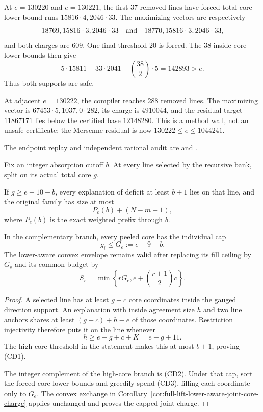 \documentclass[11pt,a4paper]{amsart}
\numberwithin{equation}{section}
\theoremstyle{remark}
\begin{document}
\begin{remark}
At \(e=130220\) and \(e=130221\), the first 37 removed lines have forced
total-core lower-bound runs \(15816\cdot4,2046\cdot33\).  The maximizing
vectors are respectively
\[
 18769,15816\cdot3,2046\cdot33
 \quad\hbox{and}\quad
 18770,15816\cdot3,2046\cdot33,
\]
and both charges are \(609\).  One final threshold \(20\) is forced.  The
38 inside-core lower bounds then give
\[
 5\cdot15811+33\cdot2041-\binom{38}{2}\cdot5
 =142893>e.
\]
Thus both supports are safe.

At adjacent \(e=130222\), the compiler reaches 288 removed lines.  The
maximizing vector is \(67453\cdot5,1037,0\cdot282\), its charge is
\(4910044\), and the residual target \(11867171\) lies below the certified
base \(12148280\).  This is a method wall, not an unsafe certificate; the
Mersenne residual is now \(130222\le e\le1044241\).

The endpoint replay and independent rational audit are
and
.
\end{remark}

\begin{corollary}
\label{cor:full-lift-core-dichotomy-capped-charge}
Fix an integer absorption cutoff $b$.  At every line selected by the
recursive bank, split on its actual total core $g$.

If $g\ge e+10-b$, every explanation of deficit at least $b+1$ lies on
that line, and the original family has size at most
\[
 P_e(b)+(N-m+1),                                  \tag{CD1}
\]
where $P_e(b)$ is the exact weighted prefix through $b$.

In the complementary branch, every peeled core has the individual cap
\[
 g_i\le G_e:=e+9-b.                               \tag{CD2}
\]
The lower-aware convex envelope remains valid after replacing its fill
ceiling by $G_e$ and its common budget by
\[
 S_r=\min\left\{rG_e,e+\binom{r+1}{2}c\right\}.   \tag{CD3}
\]
\end{corollary}

\begin{proof}
A selected line has at least $g-c$ core coordinates inside the gauged
direction support.  An explanation with inside agreement size $h$ and
two line anchors shares at least $(g-c)+h-e$ of those coordinates.
Restriction injectivity therefore puts it on the line whenever
\[
 h\ge e-g+c+K=e-g+11.
\]
The high-core threshold in the statement makes this at most $b+1$,
proving (CD1).

The integer complement of the high-core branch is (CD2).  Under that cap,
sort the forced core lower bounds and greedily spend (CD3), filling each
coordinate only to $G_e$.  The convex exchange in
Corollary~\ref{cor:full-lift-lower-aware-joint-core-charge} applies
unchanged and proves the capped joint charge.
\end{proof}
\end{document}
